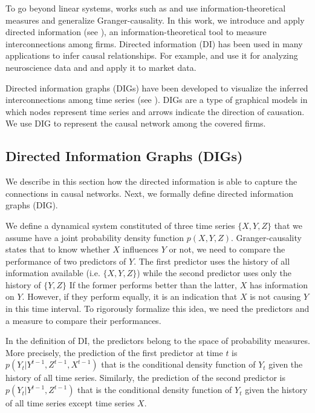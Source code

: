 To go beyond linear systems, works such as \citet{directed} and \citet{massey} use information-theoretical measures and generalize Granger-causality. 
In this work, we introduce and apply directed information (see \citet{directed}), an information-theoretical tool to measure interconnections among firms.
Directed information (DI) has been used in many applications to infer causal relationships. For example, \citet{spike} and \citet{di12} use it for analyzing neuroscience data and \citet{acc2014}  and \citet{etesami2018econometric} apply it to market data. 


Directed information graphs (DIGs) have been developed to visualize the inferred interconnections among time series (see \citet{directed}).  
DIGs are a type of graphical models in which nodes represent time series and arrows indicate the direction of causation. We use DIG to represent the causal network among the covered firms. 



\subsection{Directed Information Graphs (DIGs)}\label{sec:dig}


We describe in this section how the directed information is able to capture the connections in causal networks. Next, we formally define directed information graphs (DIG).

We define a dynamical system constituted of three time series $\{X,Y,Z\}$ that we assume have a joint probability density function $p(X,Y,Z)$. 
Granger-causality states that to know whether $X$ influences $Y$ or not, we need to compare the performance of two predictors of $Y$.
The first predictor uses the history of all information available (i.e. $\{X,Y,Z\}$) while the second predictor uses only the history of $\{Y,Z\}$
If the former performs better than the latter, $X$ has information on $Y$. However, if they perform equally, it is an indication that $X$ is not causing $Y$ in this time interval.
To rigorously formalize this idea, we need the predictors and a measure to compare their performances.

In the definition of DI,  the predictors belong to the space of probability measures.  
More precisely,  
the prediction of the first predictor at time $t$ is $p(Y_t|Y^{t-1},Z^{t-1},X^{t-1})$ that is the conditional density function of $Y_t$ given the history of all time series. Similarly, the prediction of the second predictor is $p(Y_t|Y^{t-1},Z^{t-1})$ that is the conditional density function of $Y_t$ given the history of all time series except time series $X$.

